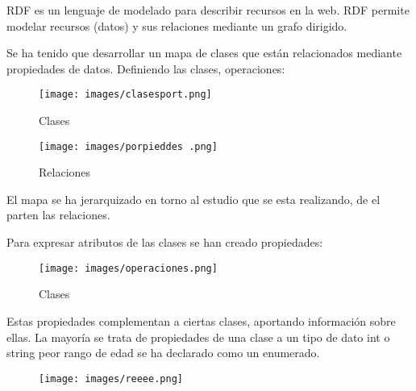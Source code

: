 \documentclass[../main.tex]{subfiles}
\begin{document}
RDF es un lenguaje de modelado para describir recursos en la web. RDF permite modelar recursos (datos) y sus relaciones mediante un grafo dirigido.

\hfill

Se ha tenido que desarrollar un mapa de clases que están relacionados mediante propiedades de datos. Definiendo las clases, operaciones:

\hfill

\begin{figure}[ht]
    \centering
    \texttt{[image: images/clasesport.png]}
    \caption{Clases}
    \label{clasesport}
\end{figure}


\begin{figure}[h]
    \centering
    \texttt{[image: images/porpieddes .png]}
    \caption{Relaciones}
    \label{Relaciones}
\end{figure}

El mapa se ha jerarquizado en torno al estudio que se esta realizando, de el parten las relaciones.

\newpage

Para expresar atributos de las clases se han creado propiedades:

\hfill

\begin{figure}[ht]
    \centering
    \texttt{[image: images/operaciones.png]}
    \caption{Clases}
    \label{operaciones}
\end{figure}

Estas propiedades complementan a ciertas clases, aportando información sobre ellas. La mayoría se trata de propiedades de una clase a un tipo de dato int o string peor rango de edad se ha declarado como un enumerado.

\hfill

\begin{figure}[ht]
    \centering
    \texttt{[image: images/reeee.png]}
    \caption{}
    \label{reeee}
\end{figure}
\end{document}
